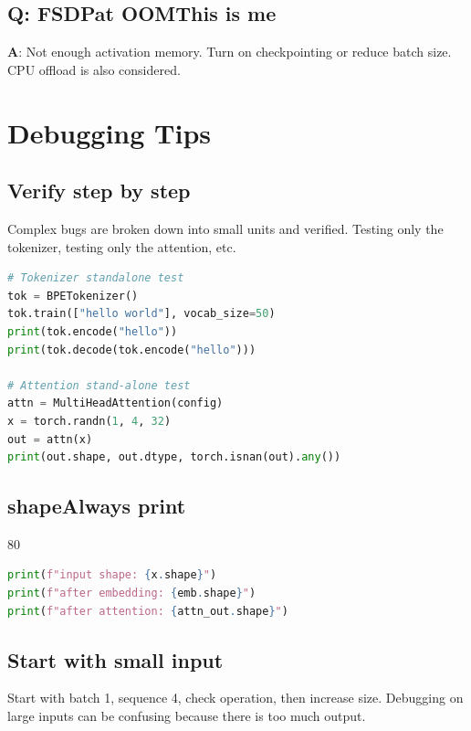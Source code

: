 \subsection{Q: FSDPat OOMThis is me}

\textbf{A}: Not enough activation memory. Turn on checkpointing or reduce batch size. CPU offload is also considered.

\section{Debugging Tips}

\subsection{Verify step by step}

Complex bugs are broken down into small units and verified. Testing only the tokenizer, testing only the attention, etc.

\begin{lstlisting}[language=Python]
# Tokenizer standalone test
tok = BPETokenizer()
tok.train(["hello world"], vocab_size=50)
print(tok.encode("hello"))
print(tok.decode(tok.encode("hello")))

# Attention stand-alone test
attn = MultiHeadAttention(config)
x = torch.randn(1, 4, 32)
out = attn(x)
print(out.shape, out.dtype, torch.isnan(out).any())
\end{lstlisting}

\subsection{shapeAlways print}

80%

\begin{lstlisting}[language=Python]
print(f"input shape: {x.shape}")
print(f"after embedding: {emb.shape}")
print(f"after attention: {attn_out.shape}")
\end{lstlisting}

\subsection{Start with small input}

Start with batch 1, sequence 4, check operation, then increase size. Debugging on large inputs can be confusing because there is too much output.

